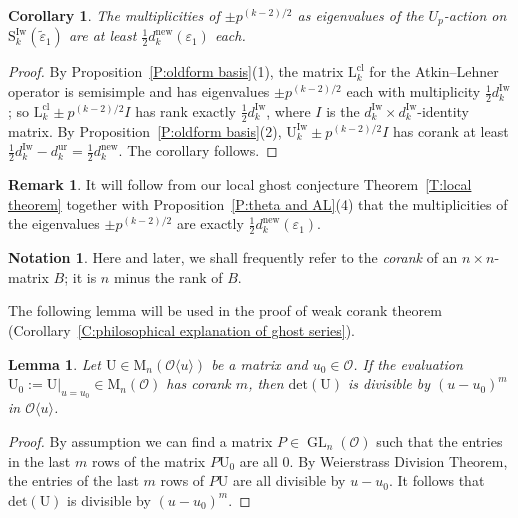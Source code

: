 \documentclass[12pt]{amsart}
\newtheorem{lemma}[subsection]{Lemma}
\newtheorem{corollary}[subsection]{Corollary}
\theoremstyle{definition}
\newtheorem{remark}[subsection]{Remark}
\newtheorem{notation}[subsection]{Notation}
\numberwithin{equation}{subsection}
\def\calO{\mathcal{O}}
\def\rmL{\mathrm{L}}
\def\rmM{\mathrm{M}}
\def\rmU{\mathrm{U}}
\def\rmS{\mathrm{S}}
\DeclareMathOperator{\GL}{GL}
\newcommand{\new}{\mathrm{new}}
\newcommand{\Iw}{\mathrm{Iw}}
\renewcommand{\det}{\mathrm{det}}
\newcommand{\cl}{\mathrm{cl}}
\newcommand{\ur}{\mathrm{ur}}
\begin{document}
\begin{corollary}
\label{C:p-new slopes}
The multiplicities of $\pm p^{(k-2)/2}$ as eigenvalues of the $U_p$-action on $\rmS_k^\Iw(\tilde \varepsilon_1)$ are at least $\frac 12 d_{k}^{\new}(\varepsilon_1)$ each.
\end{corollary}
\begin{proof}
By Proposition~\ref{P:oldform basis}(1), the matrix $\rmL_k^\cl$ for the Atkin--Lehner operator is semisimple and has eigenvalues $\pm p^{(k-2)/2}$ each with multiplicity $\frac 12d_k^\Iw$; so $\rmL_k^\cl \pm p^{(k-2)/2}I $ has rank exactly $\frac 12 d_k^\Iw$, where $I$ is the $d_k^\Iw \times d_k^\Iw$-identity matrix. By Proposition~\ref{P:oldform basis}(2), $\rmU_k^\Iw \pm p^{(k-2)/2} I$  has corank at least $\frac 12d_k^\Iw-d_k^\ur = \frac 12 d_k^\new$. The corollary follows.
\end{proof}
\begin{remark}
It will follow from our local ghost conjecture Theorem~\ref{T:local theorem} together with Proposition~\ref{P:theta and AL}(4) that the multiplicities of the eigenvalues $\pm p^{(k-2)/2}$ are exactly $\frac 12 d_{k}^{\new}(\varepsilon_1)$.
\end{remark}

\begin{notation}
	Here and later, we shall frequently refer to the \emph{corank} of an $n\times n$-matrix $B$; it is $n$ minus the rank of $B$.
\end{notation}
The following lemma will be used in the proof of weak corank theorem (Corollary~\ref{C:philosophical explanation of ghost series}).
\begin{lemma}
\label{L:corank-det}
Let $\rmU \in \rmM_n(\calO\langle u\rangle)$ be a matrix and $u_0 \in \calO$. If the evaluation $\rmU_0:=\rmU|_{u=u_0}\in \rmM_n(\calO)$ has corank $m$, then $\det (\rmU)$ is divisible by $(u-u_0)^m$ in $\calO\langle u\rangle$. 
\end{lemma}

\begin{proof}
By assumption we can find a matrix $P\in \GL_n(\calO)$ such that the entries in the last $m$ rows of the matrix $P\rmU_0$ are all $0$. By Weierstrass Division Theorem, the entries of the last $m$ rows of $P\rmU$ are all divisible by $u-u_0$. It follows that $\det (\rmU)$ is divisible by $(u-u_0)^m$.
\end{proof}
\end{document}
